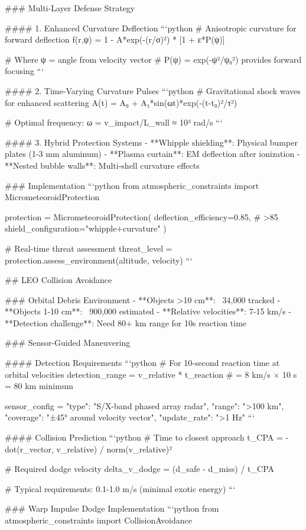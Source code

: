 ### Multi-Layer Defense Strategy

#### 1. Enhanced Curvature Deflection
```python
# Anisotropic curvature for forward deflection
f(r,ψ) = 1 - A*exp(-(r/σ)²) * [1 + ε*P(ψ)]

# Where ψ = angle from velocity vector
# P(ψ) = exp(-ψ²/ψ₀²) provides forward focusing
```

#### 2. Time-Varying Curvature Pulses
```python
# Gravitational shock waves for enhanced scattering
A(t) = A₀ + A₁*sin(ωt)*exp(-(t-t₀)²/τ²)

# Optimal frequency: ω = v_impact/L_wall ≈ 10³ rad/s
```

#### 3. Hybrid Protection Systems
- **Whipple shielding**: Physical bumper plates (1-3 mm aluminum)
- **Plasma curtain**: EM deflection after ionization
- **Nested bubble walls**: Multi-shell curvature effects

### Implementation
```python
from atmospheric_constraints import MicrometeoroidProtection

protection = MicrometeoroidProtection(
    deflection_efficiency=0.85,  # >85%
    shield_configuration="whipple+curvature"
)

# Real-time threat assessment
threat_level = protection.assess_environment(altitude, velocity)
```

## LEO Collision Avoidance

### Orbital Debris Environment
- **Objects >10 cm**: ~34,000 tracked
- **Objects 1-10 cm**: ~900,000 estimated  
- **Relative velocities**: 7-15 km/s
- **Detection challenge**: Need 80+ km range for 10s reaction time

### Sensor-Guided Maneuvering

#### Detection Requirements
```python
# For 10-second reaction time at orbital velocities
detection_range = v_relative * t_reaction
# = 8 km/s × 10 s = 80 km minimum

sensor_config = {
    "type": "S/X-band phased array radar",
    "range": ">100 km",
    "coverage": "±45° around velocity vector",
    "update_rate": ">1 Hz"
}
```

#### Collision Prediction
```python
# Time to closest approach
t_CPA = -dot(r_vector, v_relative) / norm(v_relative)²

# Required dodge velocity  
delta_v_dodge = (d_safe - d_miss) / t_CPA

# Typical requirements: 0.1-1.0 m/s (minimal exotic energy)
```

### Warp Impulse Dodge Implementation
```python
from atmospheric_constraints import CollisionAvoidance

